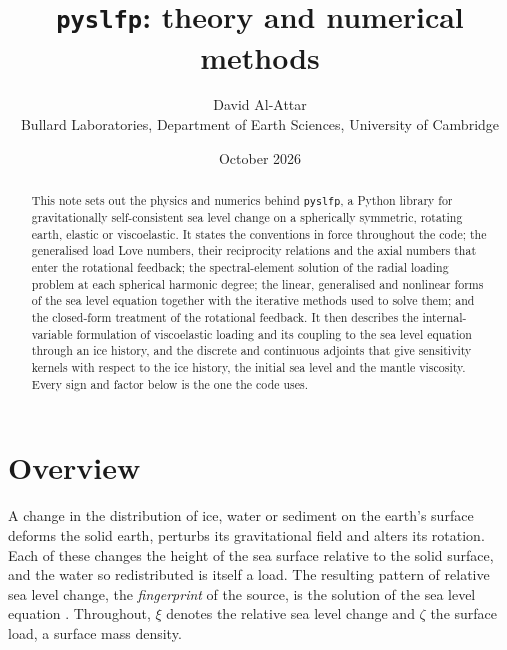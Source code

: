 \documentclass[11pt,a4paper]{article}
\title{\texttt{pyslfp}: theory and numerical methods}
\author{David Al-Attar\\[2pt]
\small Bullard Laboratories, Department of Earth Sciences, University of Cambridge}
\date{October 2026}
\numberwithin{equation}{section}
\begin{document}
\maketitle

\begin{abstract}
\noindent
This note sets out the physics and numerics behind \texttt{pyslfp}, a Python
library for gravitationally self-consistent sea level change on a spherically
symmetric, rotating earth, elastic or viscoelastic. It states the conventions in
force throughout the code; the generalised load Love numbers, their reciprocity
relations and the axial numbers that enter the rotational feedback; the
spectral-element solution of the radial loading problem at each spherical
harmonic degree; the linear, generalised and nonlinear forms of the sea level
equation together with the iterative methods used to solve them; and the
closed-form treatment of the rotational feedback. It then describes the
internal-variable formulation of viscoelastic loading and its coupling to the
sea level equation through an ice history, and the discrete and continuous
adjoints that give sensitivity kernels with respect to the ice history, the
initial sea level and the mantle viscosity. Every sign and factor below is the
one the code uses.
\end{abstract}

\tableofcontents

\section{Overview}
\label{sec:overview}

A change in the distribution of ice, water or sediment on the earth's surface
deforms the solid earth, perturbs its gravitational field and alters its
rotation. Each of these changes the height of the sea surface relative to the
solid surface, and the water so redistributed is itself a load. The resulting
pattern of relative sea level change, the \emph{fingerprint} of the source, is
the solution of the sea level equation
\citep{FarrellClark1976,MitrovicaMilne2003,KendallEtAl2005}. Throughout,
$\xi$ denotes the relative sea level change and $\zeta$ the surface load, a
surface mass density.
\end{document}
